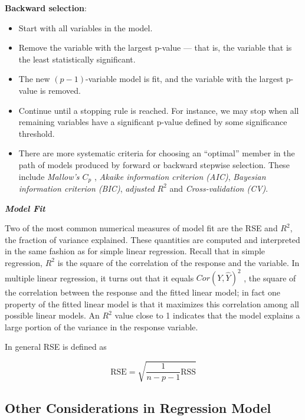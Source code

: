 \documentclass[]{book}
\providecommand{\tightlist}{%
  \setlength{\itemsep}{0pt}\setlength{\parskip}{0pt}}
\newenvironment{rmdblock}[1]
  {\begin{shaded*}
  \begin{itemize}
  \renewcommand{\labelitemi}{
    \raisebox{-.7\height}[0pt][0pt]{
      {\setkeys{Gin}{width=2em,keepaspectratio}\texttt{[image: img/icons/\#1]}}
    }
  }
  \item
  }
  {
  \end{itemize}
  \end{shaded*}
  }
\newenvironment{rmdinsight}
  {\begin{rmdblock}{insight}}
  {\end{rmdblock}}
\begin{document}
\textbf{Backward selection}:

\begin{itemize}
\tightlist
\item
  Start with all variables in the model.
\item
  Remove the variable with the largest p-value --- that is, the variable
  that is the least statistically significant.
\item
  The new \((p − 1)\)-variable model is fit, and the variable with the
  largest p-value is removed.
\item
  Continue until a stopping rule is reached. For instance, we may stop
  when all remaining variables have a significant p-value defined by
  some significance threshold.
\end{itemize}

\begin{rmdinsight}
There are more systematic criteria for choosing an ``optimal'' member in
the path of models produced by forward or backward stepwise selection.
These include \emph{Mallow's \(C_p\)} , \emph{Akaike information
criterion (AIC)}, \emph{Bayesian information criterion (BIC)},
\emph{adjusted \(R^2\)} and \emph{Cross-validation (CV)}.
\end{rmdinsight}

\textbf{\emph{Model Fit}}

Two of the most common numerical measures of model fit are the RSE and
\(R^2\), the fraction of variance explained. These quantities are
computed and interpreted in the same fashion as for simple linear
regression. Recall that in simple regression, \(R^2\) is the square of
the correlation of the response and the variable. In multiple linear
regression, it turns out that it equals \(Cor(Y, \hat{Y})^2\) , the
square of the correlation between the response and the fitted linear
model; in fact one property of the fitted linear model is that it
maximizes this correlation among all possible linear models. An \(R^2\)
value close to 1 indicates that the model explains a large portion of
the variance in the response variable.

In general RSE is defined as

\[ \text{RSE} = \sqrt{\frac{1}{n-p-1}\text{RSS}} \]

\subsection{Other Considerations in Regression
Model}\label{other-considerations-in-regression-model}
\end{document}
